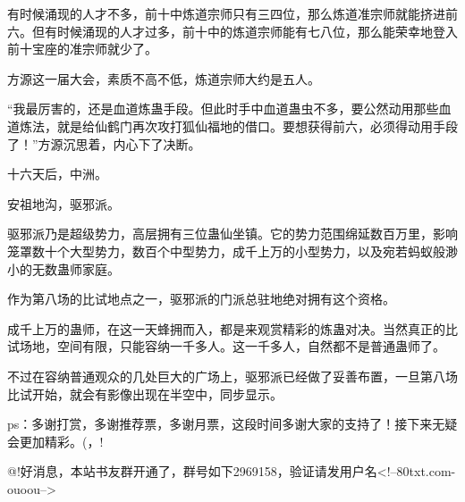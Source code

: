 \begin{this_body}
有时候涌现的人才不多，前十中炼道宗师只有三四位，那么炼道准宗师就能挤进前六。但有时候涌现的人才过多，前十中的炼道宗师能有七八位，那么能荣幸地登入前十宝座的准宗师就少了。

方源这一届大会，素质不高不低，炼道宗师大约是五人。

“我最厉害的，还是血道炼蛊手段。但此时手中血道蛊虫不多，要公然动用那些血道炼法，就是给仙鹤门再次攻打狐仙福地的借口。要想获得前六，必须得动用手段了！”方源沉思着，内心下了决断。

十六天后，中洲。

安祖地沟，驱邪派。

驱邪派乃是超级势力，高层拥有三位蛊仙坐镇。它的势力范围绵延数百万里，影响笼罩数十个大型势力，数百个中型势力，成千上万的小型势力，以及宛若蚂蚁般渺小的无数蛊师家庭。

作为第八场的比试地点之一，驱邪派的门派总驻地绝对拥有这个资格。

成千上万的蛊师，在这一天蜂拥而入，都是来观赏精彩的炼蛊对决。当然真正的比试场地，空间有限，只能容纳一千多人。这一千多人，自然都不是普通蛊师了。

不过在容纳普通观众的几处巨大的广场上，驱邪派已经做了妥善布置，一旦第八场比试开始，就会有影像出现在半空中，同步显示。

ps：多谢打赏，多谢推荐票，多谢月票，这段时间多谢大家的支持了！接下来无疑会更加精彩。(，!

@!好消息，本站书友群开通了，群号如下2969158，验证请发用户名<!--80txt.com-ouoou-->

\end{this_body}

